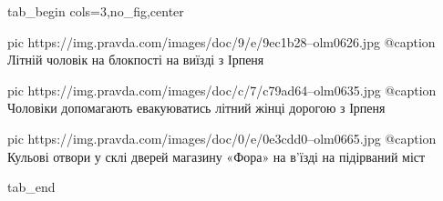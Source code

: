  
 
 
 
 


\ifcmt
  tab_begin cols=3,no_fig,center

     pic https://img.pravda.com/images/doc/9/e/9ec1b28--olm0626.jpg
		 @caption Літній чоловік на блокпості на виїзді з Ірпеня

		 pic https://img.pravda.com/images/doc/c/7/c79ad64--olm0635.jpg
		 @caption Чоловіки допомагають евакуюватись літний жінці дорогою з Ірпеня

		 pic https://img.pravda.com/images/doc/0/e/0e3cdd0--olm0665.jpg
		 @caption Кульові отвори у склі дверей магазину «Фора» на в'їзді на підірваний міст

  tab_end
\fi
